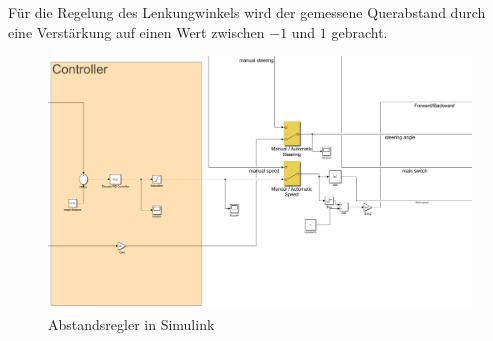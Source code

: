 Für die Regelung des Lenkungwinkels wird der gemessene  Querabstand durch eine Verstärkung auf einen Wert zwischen $-1$ und $1$ gebracht. 


\begin{figure}[h]
	\centering
	\includegraphics[width=1.1\textwidth]{Controller.PNG}
	\caption{Abstandsregler in Simulink }
	\label{img:grafik-dummy}
\end{figure}
